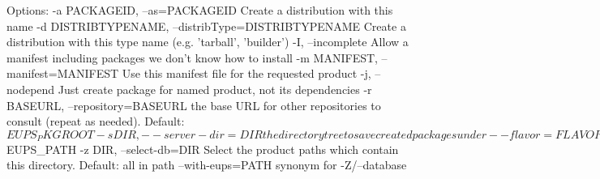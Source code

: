\documentclass{article}
\let\overbatim=\verbatim
\let\oendverbatim=\endverbatim
\renewenvironment{verbatim}
{\center\minipage{16cm}\overbatim}
{\oendverbatim\endminipage\endcenter}
\begin{document}
\begin{itemize}
\begin{verbatim}
Options:
  -a PACKAGEID, --as=PACKAGEID
                        Create a distribution with this name
  -d DISTRIBTYPENAME, --distribType=DISTRIBTYPENAME
                        Create a distribution with this type name (e.g.
                        'tarball', 'builder')
  -I, --incomplete      Allow a manifest including packages we don't know how
                        to install
  -m MANIFEST, --manifest=MANIFEST
                        Use this manifest file for the requested product
  -j, --nodepend        Just create package for named product, not its
                        dependencies
  -r BASEURL, --repository=BASEURL
                        the base URL for other repositories to consult (repeat
                        as needed).  Default: $EUPS_PKGROOT
  -s DIR, --server-dir=DIR
                        the directory tree to save created packages under
  --flavor=FLAVOR       Assume this target platform flavor (e.g. 'Linux')
  -F, --force           Force requested behaviour
  -D DISTRIBCLASSES, --distrib-class=DISTRIBCLASSES
                        register this Distrib class (repeat as needed)
  -R REBUILDPRODUCTVERSION, --rebuild=REBUILDPRODUCTVERSION
                        Create a new distribution given that product:version's
                        ABI has changed
  --rebuildSuffix=REBUILDSUFFIX
                        Specify suffix to apply to new versions generated by
                        --rebuild
  --server-class=SERVERCLASSES
                        register this DistribServer class (repeat as needed)
  -S SERVEROPTS, --server-option=SERVEROPTS
                        pass a customized option to all repositories (form
                        NAME=VALUE, repeat as needed)
  -e, --exact           Follow the as-installed versions, not the dependencies
                        in the table file
  -f USEFLAVOR, --use-flavor=USEFLAVOR
                        Create an installation specialised to the specified
                        flavor
  -T POSTTAG, --postTag=POSTTAG
                        Put TAG after version(Expr)? in VRO (may be repeated;
  -t TAG, --tag=TAG     Set the VRO based on this tag name
  --debug=DEBUG         turn on specified debugging behaviors (allowed: debug,
                        raise)
  -h, --help            show command-line help and exit
  -n, --noaction        Don't actually do anything (for debugging purposes)
  --nolocks             Disable locking of eups's internal files
  -q, --quiet           Suppress messages to user (overrides -v)
  --type=SETUPTYPE      The setup type to use (e.g. exact)
  -v, --verbose         Print extra messages about progress (repeat for ever
                        more chat)
  -V, --version         Print eups version number
  --vro=LIST            Set the Version Resolution Order
  -Z PATH, --database=PATH
                        The colon-separated list of product stacks (databases)
                        to use. Default: $EUPS_PATH
  -z DIR, --select-db=DIR
                        Select the product paths which contain this directory.
                        Default: all in path
  --with-eups=PATH      synonym for -Z/--database
\end{verbatim}


\end{itemize}
\end{document}
